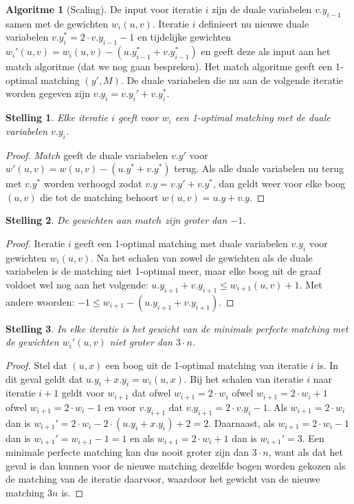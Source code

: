 \documentclass[conference]{IEEEtran}
\newtheorem{theorem}{Stelling}[section]
\theoremstyle{definition}
\newtheorem{algorithmm}{Algoritme}[section]
\theoremstyle{remark}
\begin{document}
\begin{algorithmm}[Scaling]
    De input voor iteratie $i$ zijn de duale variabelen $v.y_{i-1}$ samen met de gewichten $w_i(u, v)$.
    Iteratie $i$ definieert nu nieuwe duale variabelen $v.y_{i}^{*} = 2 \cdot v.y_{i-1} - 1$ en tijdelijke gewichten $w_{i}'(u, v) = w_{i}(u, v) - (u.y_{i-1}^* + v.y_{i-1}^*)$ en geeft deze als input aan het match algoritme (dat we nog gaan bespreken). Het match algoritme geeft een 1-optimal matching $(y', M)$. De duale variabelen die nu aan de volgende iteratie worden gegeven zijn $v.y_i = v.y_i' + v.y_i^*$.
\end{algorithmm}

\begin{theorem}
    Elke iteratie $i$ geeft voor $w_i$ een 1-optimal matching met de duale variabelen $v.y_i$.
\end{theorem}
\begin{proof}
    \textit{Match} geeft de duale variabelen $v.y'$ voor $w'(u, v) = w(u, v) - (u.y^{*} + v.y^{*})$ terug. Als alle duale variabelen nu terug met $v.y^{*}$ worden verhoogd zodat $v.y = v.y' + v.y^{*}$, dan geldt weer voor elke boog $(u, v)$ die tot de matching behoort $w(u, v) = u.y + v.y$.
\end{proof}

\begin{theorem}
    De gewichten aan $match$ zijn groter dan $-1$.
\end{theorem}
\begin{proof}
    Iteratie $i$ geeft een 1-optimal matching met duale variabelen $v.y_i$ voor gewichten $w_i(u, v)$. Na het schalen van zowel de gewichten als de duale variabelen is de matching niet 1-optimal meer, maar elke boog uit de graaf voldoet wel nog aan het volgende: $u.y_{i + 1} + v.y_{i + 1} \leq w_{i + 1}(u, v) + 1$. Met andere woorden: $-1 \leq w_{i + 1} - (u.y_{i + 1} + v.y_{i + 1})$.
\end{proof}

\begin{theorem}
    In elke iteratie is het gewicht van de minimale perfecte matching met de gewichten $w_i'(u, v)$ niet groter dan $3 \cdot n$.
\end{theorem}
\begin{proof}
    Stel dat $(u, x)$ een boog uit de 1-optimal matching van iteratie $i$ is. In dit geval geldt dat $u.y_i + x.y_i = w_i(u, x)$. Bij het schalen van iteratie $i$ naar iteratie $i + 1$ geldt voor $w_{i + 1}$ dat ofwel $w_{i + 1} = 2 \cdot w_i$ ofwel $w_{i + 1} = 2 \cdot w_i + 1$ ofwel $w_{i + 1} = 2 \cdot w_i - 1$ en voor $v.y_{i + 1}$ dat $v.y_{i + 1} = 2 \cdot v.y_i - 1$.
    Als $w_{i + 1} = 2 \cdot w_i$ dan is $w_{i + 1}' = 2 \cdot w_i - 2 \cdot (u.y_i + x.y_i) + 2 = 2$. Daarnaast, als $w_{i + 1} = 2 \cdot w_i - 1$ dan is $w_{i + 1}' = w_{i + 1} - 1 = 1$ en als $w_{i + 1} = 2 \cdot w_i + 1$ dan is $w_{i + 1}' = 3$. Een minimale perfecte matching kan dus nooit groter zijn dan $3 \cdot n$, want als dat het geval is dan kunnen voor de nieuwe matching dezelfde bogen worden gekozen als de matching van de iteratie daarvoor, waardoor het gewicht van de nieuwe matching $3n$ is.
\end{proof}
\end{document}
